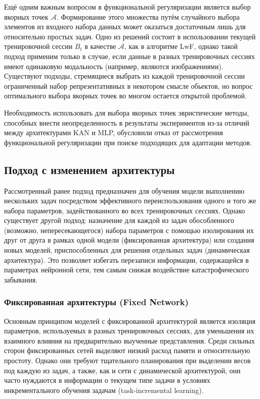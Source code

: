 \documentclass[a4paper,14pt]{extarticle}
\begin{document}
Ещё одним важным вопросом в функциональной регуляризации является выбор якорных
точек \(\mathcal{A}\). Формирование этого множества путём случайного выбора
элементов из входного набора данных может оказаться достаточным лишь для
относительно простых задач. Одно из решений состоит в использовании текущей
тренировочной сессии \(B_t\) в качестве \(\mathcal{A}\), как в алгоритме LwF,
однако такой подход применим только в случае, если данные в
разных тренировочных сессиях имеют одинаковую модальность (например, являются
изображениями). Существуют подходы, стремящиеся выбрать из каждой
тренировочной сессии ограниченный набор репрезентативных в некотором смысле
обьектов, но вопрос оптимального выбора якорных точек во многом остается
открытой проблемой.

Необходимость использовать для выбора якорных точек эвристические методы,
способных внести неопределенность в результаты экспериментов из-за отличий между
архитектурами KAN и MLP, обусловили отказ от рассмотрения функциональной
регуляризации при поиске подходящих для адаптации методов.
\subsection{Подход с изменением архитектуры}
Рассмотренный ранее подход предназначен для обучения модели выполнению
нескольких задач посредством эффективного переиспользования одного и того же
набора параметров, задействованного во всех тренировочных сессиях. Однако
существует другой подход: назначение для каждой из задач обособленного
(возможно, непересекающегося) набора параметров с помощью изолирования
их друг от друга в рамках одной модели (фиксированная архитектура) или создания
новых моделей, приспособленных для решения отдельных задач (динамическая
архитектура). Это позволяет избегать перезаписи информации, содержащейся в
параметрах нейронной сети, тем самым снижая воздействие катастрофического
забывания. 
\subsubsection{Фиксированная архитектуры (Fixed Network)}
Основным принципом моделей с фиксированной архитектурой является изоляция
параметров, используемых в разных тренировочных сессиях, для уменьшения их
взаимного влияния на предварительно выученные представления. Среди
сильных сторон фиксированных сетей выделяют низкий расход памяти и относительную
простоту. Однако они требуют тщательного планирования при выделении весов под
каждую из задач, а также, как и сети с динамической архитектурой, они часто
нуждаются в информации о текущем типе задачи в условиях инкрементального
обучения задачам (task-incremental learning).
\end{document}
